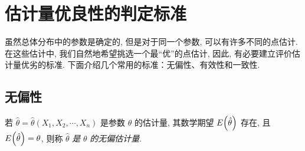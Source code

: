 \section{估计量优良性的判定标准}

虽然总体分布中的参数是确定的, 但是对于同一个参数, 可以有许多不同的点估计. 
在这些估计中, 我们自然地希望挑选一个最“优”的点估计, 因此, 有必要建立评价估计量优劣的标准. 下面介绍几个常用的标准：无偏性、有效性和一致性.

\subsection{无偏性}

\begin{definition}[无偏性]
    若 $ \hat{\theta}=\hat{\theta}\left(X_{1}, X_{2}, \cdots, X_{n}\right) $ 是参数 $ \theta $ 的估计量, 
    其数学期望 $ E\qty(\hat{\theta}) $ 存在, 且 $ E\qty(\hat{\theta})=\theta $, 则称 $ \hat{\theta} $ \textit{是} $ \theta $ \textit{的无偏估计量}.
\end{definition}

